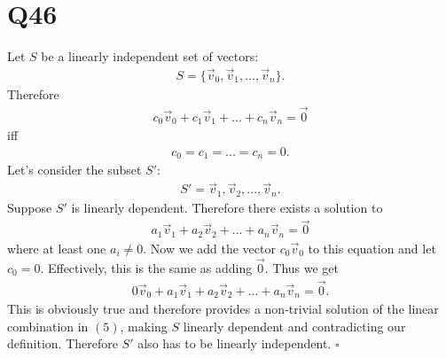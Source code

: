 \documentclass{article}
\begin{document}
\section*{Q46}
Let $S$ be a linearly independent set of vectors:
\begin{align}
    S=\{\vec v_0, \vec v_1, ..., \vec v_n\}.
\end{align}
Therefore
\begin{align}
    c_0\vec v_0 + c_1\vec v_1 + ... + c_n\vec v_n = \vec 0
\end{align}
iff
\begin{align}
    c_0 = c_1 = ... = c_n = 0.
\end{align}
Let's consider the subset $S'$:
\begin{align}
    S'={\vec v_1, \vec v_2, ..., \vec v_n}.
\end{align}
Suppose $S'$ is linearly dependent. Therefore there exists a solution to
\begin{align}
    a_1\vec v_1 + a_2\vec v_2 + ... + a_n\vec v_n = \vec 0
\end{align}
where at least one $a_i\not=0$. Now we add the vector $c_0\vec v_0$ to this equation and let $c_0 = 0$.
Effectively, this is the same as adding $\vec 0$.
Thus we get
\begin{align}
    0\vec v_0 + a_1\vec v_1 + a_2\vec v_2 + ... + a_n\vec v_n = \vec 0.
\end{align}
This is obviously true and therefore provides a non-trivial solution of the linear combination in $(5)$, making $S$ linearly dependent and contradicting our definition.
Therefore $S'$ also has to be linearly independent. $\square$
\end{document}

